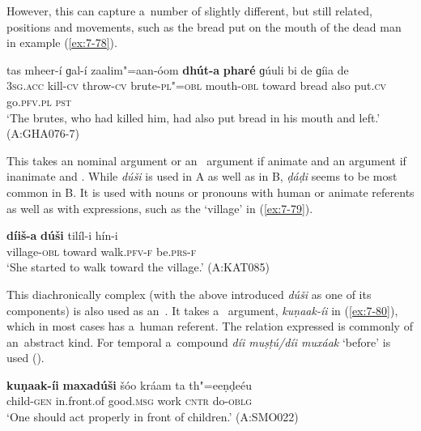\begin{exe}
\largerpage
However, this  can capture a~number of slightly different, but still related, positions and movements, such as the bread put on the mouth of the dead man in example (\ref{ex:7-78}). 

\ea
\label{ex:7-78}
\gll tas mheer-í ɡal-í zaalim"=aan-óom \textbf{dhút-a} \textbf{pharé} ɡúuli bi de ɡíia de \\
\textsc{3sg.acc} kill-\textsc{cv} throw-\textsc{cv} brute-\textsc{pl"=obl} mouth-\textsc{obl} toward bread also put.\textsc{cv} go.\textsc{pfv.pl} \textsc{pst} \\
\glt `The brutes, who had killed him, had also put bread in his mouth and left.' (A:GHA076-7)
\z

 This  takes an  nominal argument or an~  argument if animate and an  argument if inanimate and . While \textit{dúši} is used in A as well as in B, \textit{ḍáḍi} seems to be most common in B. It is used with nouns or pronouns with human or animate referents as well as with  expressions, such as the `village' in (\ref{ex:7-79}). 

\begin{exe}
\ex
\label{ex:7-79}
\gll \textbf{díiš-a} \textbf{dúši} tilíl-i hín-i \\
village-\textsc{obl} toward walk.\textsc{pfv-f} be.\textsc{prs-f} \\
\glt `She started to walk toward the village.' (A:KAT085)
\end{exe}

 This diachronically complex  (with the above introduced \textit{dúši} as one of its components) is also used as an~. It takes a~ argument, \textit{kuṇaak-íi} in (\ref{ex:7-80}), which in most cases has a~human referent. The relation expressed is commonly of an~abstract kind. For temporal  a~compound  \textit{díi muṣṭú/díi muxáak} `before' is used ().

\begin{exe}
\ex
\label{ex:7-80}
\gll \textbf{kuṇaak-íi} \textbf{maxadúši} šóo kráam ta th"=eeṇḍeéu \\
child-\textsc{gen}  in.front.of good.\textsc{msg} work \textsc{cntr} do-\textsc{oblg} \\
\glt `One should act properly in front of children.' (A:SMO022)
\end{exe}



\end{exe}

